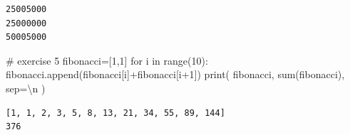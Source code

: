 \documentclass[
  a4paper,
  DIV=11,
  numbers=noendperiod]{scrreprt}
\newenvironment{Shaded}{\begin{snugshade}}{\end{snugshade}}
\newcommand{\BuiltInTok}[1]{\textcolor[rgb]{0.00,0.23,0.31}{#1}}
\newcommand{\CharTok}[1]{\textcolor[rgb]{0.13,0.47,0.30}{#1}}
\newcommand{\CommentTok}[1]{\textcolor[rgb]{0.37,0.37,0.37}{#1}}
\newcommand{\ControlFlowTok}[1]{\textcolor[rgb]{0.00,0.23,0.31}{#1}}
\newcommand{\DecValTok}[1]{\textcolor[rgb]{0.68,0.00,0.00}{#1}}
\newcommand{\KeywordTok}[1]{\textcolor[rgb]{0.00,0.23,0.31}{#1}}
\newcommand{\NormalTok}[1]{\textcolor[rgb]{0.00,0.23,0.31}{#1}}
\newcommand{\OperatorTok}[1]{\textcolor[rgb]{0.37,0.37,0.37}{#1}}
\newcommand{\StringTok}[1]{\textcolor[rgb]{0.13,0.47,0.30}{#1}}
\begin{document}
\begin{verbatim}
25005000
25000000
50005000
\end{verbatim}

\begin{Shaded}
\begin{Highlighting}[]
\CommentTok{\# exercise 5}
\NormalTok{fibonacci}\OperatorTok{=}\NormalTok{[}\DecValTok{1}\NormalTok{,}\DecValTok{1}\NormalTok{]}
\ControlFlowTok{for}\NormalTok{ i }\KeywordTok{in} \BuiltInTok{range}\NormalTok{(}\DecValTok{10}\NormalTok{):}
\NormalTok{    fibonacci.append(fibonacci[i]}\OperatorTok{+}\NormalTok{fibonacci[i}\OperatorTok{+}\DecValTok{1}\NormalTok{])}
\BuiltInTok{print}\NormalTok{(}
\NormalTok{    fibonacci,}
    \BuiltInTok{sum}\NormalTok{(fibonacci),}
\NormalTok{    sep}\OperatorTok{=}\StringTok{\textquotesingle{}}\CharTok{\textbackslash{}n}\StringTok{\textquotesingle{}}
\NormalTok{)}
\end{Highlighting}
\end{Shaded}

\begin{verbatim}
[1, 1, 2, 3, 5, 8, 13, 21, 34, 55, 89, 144]
376
\end{verbatim}
\end{document}
